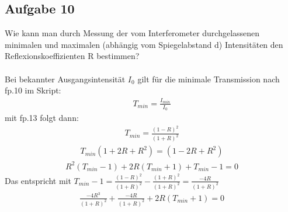 \documentclass[a4paper,10pt]{scrartcl}
\begin{document}
	\subsection{Aufgabe 10}
	Wie kann man durch Messung der vom Interferometer durchgelassenen minimalen und maximalen
	(abhängig vom Spiegelabstand d) Intensitäten den Reflexionskoeffizienten
	R bestimmen?\\
	\\
	Bei bekannter Ausgangsintensität \(I_{0}\) gilt für die minimale Transmission nach fp.10 im Skript:
	\begin{align*}
	T_{min}=\frac{I_{min}}{I_{0}}
	\end{align*}
	mit fp.13 folgt dann:
	\begin{align*}
	T_{min}=\frac{(1-R)^{2}}{(1+R)^{2}}
	\end{align*}
	\begin{align*}
	T_{min}(1+2R+R^{2})=(1-2R+R^{2})
	\end{align*}
	\begin{align*}
	R^{2}(T_{min}-1)+2R(T_{min}+1)+T_{min}-1=0
	\end{align*}
	Das entspricht mit \(T_{min}-1=\frac{(1-R)^{2}}{(1+R)^{2}}-\frac{(1+R)^{2}}{(1+R)^{2}}=\frac{-4R}{(1+R)^{2}}\)
	\begin{align*}
	\frac{-4R^{3}}{(1+R)^{2}}+\frac{-4R}{(1+R)^{2}}+2R(T_{min}+1)=0
	\end{align*}
\end{document}
